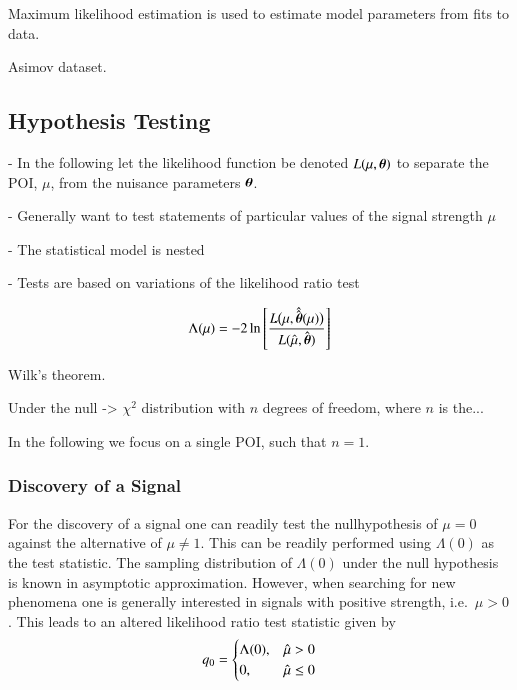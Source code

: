 Maximum likelihood estimation is used to estimate model parameters from fits to
data.

Asimov dataset.


\subsection{Hypothesis Testing}

- In the following let the likelihood function be denoted
$L(\mu, \myvec{\theta})$ to separate the POI, $\mu$, from the nuisance
parameters $\myvec{\theta}$.

- Generally want to test statements of particular values of the signal strength
$\mu$

- The statistical model is nested

- Tests are based on variations of the likelihood ratio test

\begin{align*}
  \Lambda(\mu) = -2 \ln \left[ \frac{ L\bigl(\mu, \hat{\hat{\myvec{\theta}}}(\mu) \bigr)}{L(\muhat, \hat{\myvec{\theta}})} \right]
\end{align*}

Wilk's theorem.

Under the null -> $\chi^2$ distribution with $n$ degrees of freedom, where $n$
is the...

In the following we focus on a single POI, such that $n = 1$.


\subsubsection{Discovery of a Signal}

For the discovery of a signal one can readily test the nullhypothesis of
$\mu = 0$ against the alternative of $\mu \neq 1$. This can be readily performed
using $\Lambda(0)$ as the test statistic. The sampling distribution of
$\Lambda(0)$ under the null hypothesis is known in asymptotic
approximation. However, when searching for new phenomena one is generally
interested in signals with positive strength, i.e.\ $\mu > 0$. This leads to an
altered likelihood ratio test statistic given by
\begin{align*}
  q_0 = \begin{cases}
          \Lambda(0), & \hat{\mu} > 0 \\
          0,          & \hat{\mu} \leq 0
        \end{cases}
\end{align*}


